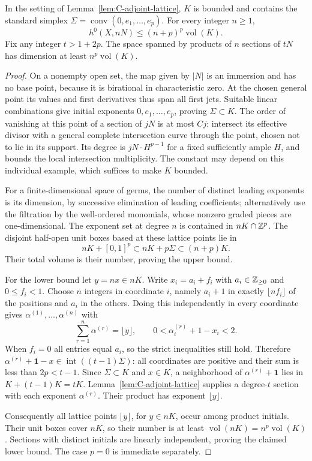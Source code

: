 \begin{lemma}\label{lem:C-jet-count}
In the setting of Lemma~\ref{lem:C-adjoint-lattice}, $K$ is bounded and contains the standard
simplex $\Sigma=\operatorname{conv}(0,e_1,\ldots,e_p)$.  For every
integer $n\ge1$,
\[
 h^0(X,nN)\le(n+p)^p\operatorname{vol}(K).
\]
Fix any integer $t>1+2p$.  The space spanned by products of $n$ sections
of $tN$ has dimension at least $n^p\operatorname{vol}(K)$.
\end{lemma}
\begin{proof}
On a nonempty open set, the map given by $|N|$ is an immersion and
has no base point, because it is birational in characteristic zero.
At the chosen general point its values and first derivatives thus
span all first jets.  Suitable linear combinations give initial
exponents $0,e_1,\ldots,e_p$, proving $\Sigma\subset K$.
The order of vanishing at this point of a section of $jN$ is at most
$Cj$: intersect its effective divisor with a general complete
intersection curve through the point, chosen not to lie in its
support.  Its degree is $jN\cdot H^{p-1}$ for a fixed sufficiently
ample $H$, and bounds the local intersection multiplicity.  The
constant may depend on this individual example, which suffices to
make $K$ bounded.

For a finite-dimensional space of germs, the number of distinct
leading exponents is its dimension, by successive elimination of
leading coefficients; alternatively use the filtration by the
well-ordered monomials, whose nonzero graded pieces are one-dimensional.
The exponent set at degree $n$ is contained in $nK\cap\mathbb Z^p$.
The disjoint half-open unit boxes based at these lattice points lie
in
\[
 nK+[0,1]^p\subset nK+p\Sigma\subset(n+p)K.
\]
Their total volume is their number, proving the upper bound.

For the lower bound let $y=nx\in nK$.  Write $x_i=a_i+f_i$ with
$a_i\in\mathbb Z_{\ge0}$ and $0\le f_i<1$.  Choose $n$ integers
in coordinate $i$, namely $a_i+1$ in exactly $\lfloor nf_i\rfloor$
of the positions and $a_i$ in the others.  Doing this independently
in every coordinate gives $\alpha^{(1)},\ldots,\alpha^{(n)}$ with
\[
 \sum_{r=1}^n\alpha^{(r)}=\lfloor y\rfloor,
 \qquad 0<\alpha_i^{(r)}+1-x_i<2.
\]
When $f_i=0$ all entries equal $a_i$, so the strict inequalities still
hold.  Therefore
$\alpha^{(r)}+\mathbf1-x\in\operatorname{int}((t-1)\Sigma)$:
all coordinates are positive and their sum is less than $2p<t-1$.
Since $\Sigma\subset K$ and $x\in K$, a neighborhood of
$\alpha^{(r)}+\mathbf1$ lies in
$K+(t-1)K=tK$.  Lemma~\ref{lem:C-adjoint-lattice} supplies a degree-$t$ section
with each exponent $\alpha^{(r)}$.  Their product has exponent
$\lfloor y\rfloor$.

Consequently all lattice points $\lfloor y\rfloor$, for $y\in nK$,
occur among product initials.  Their unit boxes cover $nK$, so their
number is at least $\operatorname{vol}(nK)=n^p\operatorname{vol}(K)$.
Sections with distinct initials are linearly independent, proving
the claimed lower bound.  The case $p=0$ is immediate separately.
\end{proof}

